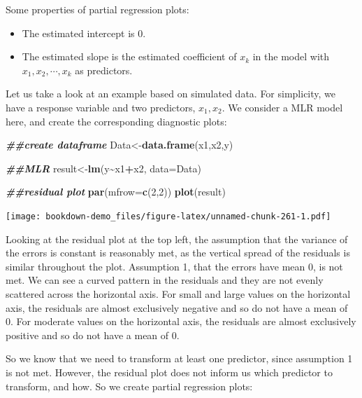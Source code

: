\documentclass[
]{book}
\newenvironment{Shaded}{\begin{snugshade}}{\end{snugshade}}
\newcommand{\AttributeTok}[1]{\textcolor[rgb]{0.13,0.29,0.53}{#1}}
\newcommand{\DecValTok}[1]{\textcolor[rgb]{0.00,0.00,0.81}{#1}}
\newcommand{\DocumentationTok}[1]{\textcolor[rgb]{0.56,0.35,0.01}{\textbf{\textit{#1}}}}
\newcommand{\FunctionTok}[1]{\textcolor[rgb]{0.13,0.29,0.53}{\textbf{#1}}}
\newcommand{\NormalTok}[1]{#1}
\newcommand{\OtherTok}[1]{\textcolor[rgb]{0.56,0.35,0.01}{#1}}
\newcommand{\SpecialCharTok}[1]{\textcolor[rgb]{0.81,0.36,0.00}{\textbf{#1}}}
\providecommand{\tightlist}{%
  \setlength{\itemsep}{0pt}\setlength{\parskip}{0pt}}
\begin{document}
Some properties of partial regression plots:

\begin{itemize}
\tightlist
\item
  The estimated intercept is 0.
\item
  The estimated slope is the estimated coefficient of \(x_k\) in the model with \(x_1, x_2, \cdots, x_{k}\) as predictors.
\end{itemize}

Let us take a look at an example based on simulated data. For simplicity, we have a response variable and two predictors, \(x_1, x_2\). We consider a MLR model here, and create the corresponding diagnostic plots:

\begin{Shaded}
\begin{Highlighting}[]
\DocumentationTok{\#\#create dataframe}
\NormalTok{Data}\OtherTok{\textless{}{-}}\FunctionTok{data.frame}\NormalTok{(x1,x2,y)}

\DocumentationTok{\#\#MLR}
\NormalTok{result}\OtherTok{\textless{}{-}}\FunctionTok{lm}\NormalTok{(y}\SpecialCharTok{\textasciitilde{}}\NormalTok{x1}\SpecialCharTok{+}\NormalTok{x2, }\AttributeTok{data=}\NormalTok{Data)}

\DocumentationTok{\#\#residual plot}
\FunctionTok{par}\NormalTok{(}\AttributeTok{mfrow=}\FunctionTok{c}\NormalTok{(}\DecValTok{2}\NormalTok{,}\DecValTok{2}\NormalTok{))}
\FunctionTok{plot}\NormalTok{(result)}
\end{Highlighting}
\end{Shaded}

\texttt{[image: bookdown-demo\_files/figure-latex/unnamed-chunk-261-1.pdf]}

Looking at the residual plot at the top left, the assumption that the variance of the errors is constant is reasonably met, as the vertical spread of the residuals is similar throughout the plot. Assumption 1, that the errors have mean 0, is not met. We can see a curved pattern in the residuals and they are not evenly scattered across the horizontal axis. For small and large values on the horizontal axis, the residuals are almost exclusively negative and so do not have a mean of 0. For moderate values on the horizontal axis, the residuals are almost exclusively positive and so do not have a mean of 0.

So we know that we need to transform at least one predictor, since assumption 1 is not met. However, the residual plot does not inform us which predictor to transform, and how. So we create partial regression plots:
\end{document}

